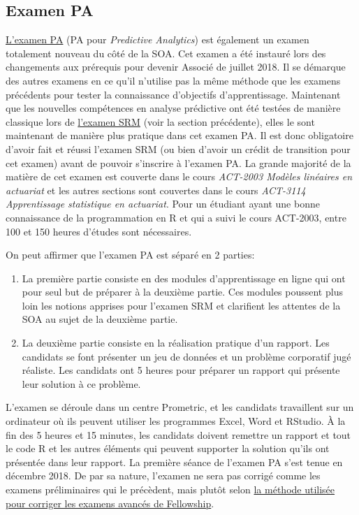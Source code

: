\subsection*{Examen PA}
\label{subsec:exampa}

\href{https://www.soa.org/Education/Exam-Req/edu-exam-pa-detail.aspx}{L'examen PA} (PA pour \textit{Predictive Analytics}) est également un examen totalement nouveau du côté de la SOA. Cet examen a été instauré lors des changements aux prérequis pour devenir Associé de juillet 2018. Il se démarque des autres examens en ce qu'il n'utilise pas la même méthode que les examens précédents pour tester la connaissance d'objectifs d'apprentissage. Maintenant que les nouvelles compétences en analyse prédictive ont été testées de manière classique lors de \href{https://www.soa.org/Education/Exam-Req/edu-exam-srm-detail.aspx}{l'examen SRM} (voir la section précédente), elles le sont maintenant de manière plus pratique dans cet examen PA. Il est donc obligatoire d'avoir fait et réussi l'examen SRM (ou bien d'avoir un crédit de transition pour cet examen) avant de pouvoir s'inscrire à l'examen PA. La grande majorité de la matière de cet examen est couverte dans le cours \textit{ACT-2003 Modèles linéaires en actuariat} et les autres sections sont couvertes dans le cours \textit{ACT-3114 Apprentissage statistique en actuariat}. Pour un étudiant ayant une bonne connaissance de la programmation en R et qui a suivi le cours ACT-2003, entre 100 et 150 heures d'études sont nécessaires.  \vspace{\baselineskip}

On peut affirmer que l'examen PA est séparé en 2 parties:
\begin{enumerate}
\item La première partie consiste en des modules d'apprentissage en ligne qui ont pour seul but de préparer à la deuxième partie. Ces modules poussent plus loin les notions apprises pour l'examen SRM et clarifient les attentes de la SOA au sujet de la deuxième partie.
\item La deuxième partie consiste en la réalisation pratique d'un rapport. Les candidats se font présenter un jeu de données et un problème corporatif jugé réaliste. Les candidats ont 5 heures pour préparer un rapport qui présente leur solution à ce problème.
\end{enumerate}
\vspace{\baselineskip}

L'examen se déroule dans un centre Prometric, et les candidats travaillent sur un ordinateur où ils peuvent utiliser les programmes Excel, Word et RStudio. À la fin des 5 heures et 15 minutes, les candidats doivent remettre un rapport et tout le code R et les autres éléments qui peuvent supporter la solution qu'ils ont présentée dans leur rapport. La première séance de l'examen PA s'est tenue en décembre 2018. De par sa nature, l'examen ne sera pas corrigé comme les examens préliminaires qui le précèdent, mais plutôt selon \href{https://www.soa.org/Education/General-Info/edu-guide-written-exams-seminar-vids.aspx}{la méthode utilisée pour corriger les examens avancés de Fellowship}. \vspace{\baselineskip}


